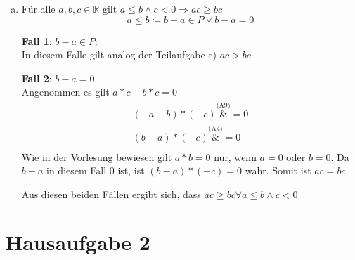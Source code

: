 \documentclass{article}
\begin{document}
\begin{enumerate}[a)]
\item Für alle $a, b, c \in \mathbb{R}$ gilt $a \leq b \land c < 0 \Rightarrow ac \geq bc$
  \[
    a \leq b \coloneqq b - a \in P \lor b - a = 0
  \]

  \begin{minipage}[t]{.45\textwidth}
    \textbf{Fall 1}: $b - a \in P$: \\
    
    In diesem Falle gilt analog der Teilaufgabe c) 
    $ac > bc$
  \end{minipage}
  \hfill
  \vrule
  \hfill
  \begin{minipage}[t]{.45\textwidth}
    \textbf{Fall 2}: $b - a = 0$ \\
    
    Angenommen es gilt $ a * c - b * c = 0$
    \begin{align*}
      (-a + b) * (-c) \overset{\text{(A9)}}&{=} 0 \\
      (b - a) * (-c) \overset{\text{(A4)}}&{=} 0 \\
    \end{align*}
    Wie in der Vorlesung bewiesen gilt $a * b = 0$ nur, wenn $a = 0$ oder $b = 0$.
    Da $b - a$ in diesem Fall $0$ ist, ist $(b - a) * (-c) = 0$ wahr.
    Somit ist $ac = bc$.
  \end{minipage}

  Aus diesen beiden Fällen ergibt sich, dass $ac \geq bc \forall a \leq b \land c < 0$ 
\end{enumerate}

\section*{Hausaufgabe 2}
\end{document}
